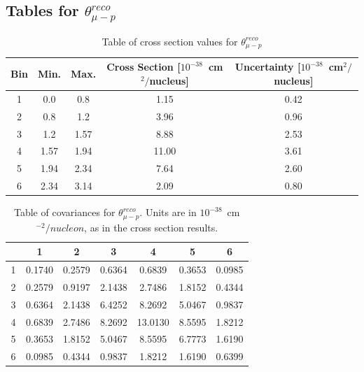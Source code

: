 \FloatBarrier\subsection{Tables for $\theta_{\mu-p}^{reco}$} 
\begin{table}[ht] 
\begin{tabular}{|c|c|c|c|c|} \hline 
Bin & Min. & Max. & Cross Section [$10^{-38}$~cm$^{2}/$nucleus] & Uncertainty [$10^{-38}$~cm$^{2}/$nucleus] \\ \hline 
1 & 0.0 & 0.8 & 1.15 & 0.42 \\ \hline 
2 & 0.8 & 1.2 & 3.96 & 0.96 \\ \hline 
3 & 1.2 & 1.57 & 8.88 & 2.53 \\ \hline 
4 & 1.57 & 1.94 & 11.00 & 3.61 \\ \hline 
5 & 1.94 & 2.34 & 7.64 & 2.60 \\ \hline 
6 & 2.34 & 3.14 & 2.09 & 0.80 \\ \hline 
\end{tabular} 
\caption{Table of cross section values for $\theta_{\mu-p}^{reco}$} 
\end{table} 
 
 
\begin{table}[ht] 
\begin{tabular}{|c|c|c|c|c|c|c|} \hline 
\ & 1 & 2 & 3 & 4 & 5 & 6 \\ \hline 
1 & 0.1740 & 0.2579 & 0.6364 & 0.6839 & 0.3653 & 0.0985 \\ \hline 
2 & 0.2579 & 0.9197 & 2.1438 & 2.7486 & 1.8152 & 0.4344 \\ \hline 
3 & 0.6364 & 2.1438 & 6.4252 & 8.2692 & 5.0467 & 0.9837 \\ \hline 
4 & 0.6839 & 2.7486 & 8.2692 & 13.0130 & 8.5595 & 1.8212 \\ \hline 
5 & 0.3653 & 1.8152 & 5.0467 & 8.5595 & 6.7773 & 1.6190 \\ \hline 
6 & 0.0985 & 0.4344 & 0.9837 & 1.8212 & 1.6190 & 0.6399 \\ \hline 
\end{tabular} 
\caption{Table of covariances for $\theta_{\mu-p}^{reco}$. 
Units are in $10^{-38}$~cm$^{-2}/nucleon$, as in the cross section results.}
\end{table} 
 

